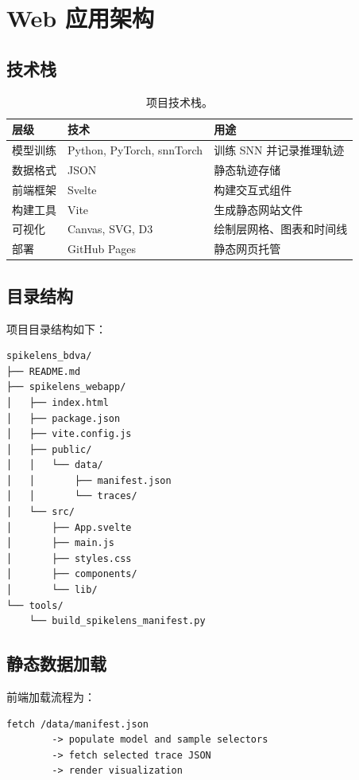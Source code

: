 \documentclass[UTF8,11pt,a4paper]{ctexart}
\begin{document}
\section{Web 应用架构}

\subsection{技术栈}

\begin{table}[H]
\centering
\caption{项目技术栈。}
\begin{tabularx}{0.9\textwidth}{lll}
\toprule
层级 & 技术 & 用途 \\
\midrule
模型训练 & Python, PyTorch, snnTorch & 训练 SNN 并记录推理轨迹 \\
数据格式 & JSON & 静态轨迹存储 \\
前端框架 & Svelte & 构建交互式组件 \\
构建工具 & Vite & 生成静态网站文件 \\
可视化 & Canvas, SVG, D3 & 绘制层网格、图表和时间线 \\
部署 & GitHub Pages & 静态网页托管 \\
\bottomrule
\end{tabularx}
\end{table}

\subsection{目录结构}

项目目录结构如下：

\begin{lstlisting}
spikelens_bdva/
├── README.md
├── spikelens_webapp/
│   ├── index.html
│   ├── package.json
│   ├── vite.config.js
│   ├── public/
│   │   └── data/
│   │       ├── manifest.json
│   │       └── traces/
│   └── src/
│       ├── App.svelte
│       ├── main.js
│       ├── styles.css
│       ├── components/
│       └── lib/
└── tools/
    └── build_spikelens_manifest.py
\end{lstlisting}

\subsection{静态数据加载}

前端加载流程为：

\begin{lstlisting}
fetch /data/manifest.json
        -> populate model and sample selectors
        -> fetch selected trace JSON
        -> render visualization
\end{lstlisting}
\end{document}
